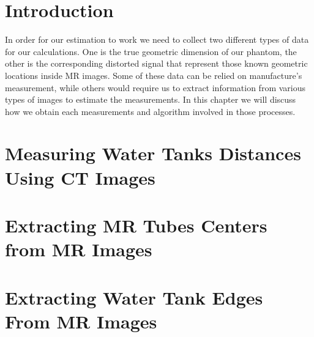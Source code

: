 \section{Introduction}
In order for our estimation to work we need to collect two different types of data for our calculations. 
One is the true geometric dimension of our phantom, the other is the corresponding distorted signal that
represent those known geometric locations inside MR images. Some of these data can be relied on manufacture's
measurement, while others would require us to extract information from various types of images to estimate the
measurements. In this chapter we will discuss how we obtain each measurements and algorithm involved in those
processes.

\section{Measuring Water Tanks Distances Using CT Images}
\label{ct_tank}


\section{Extracting MR Tubes Centers from MR Images}
\label{tubes}


\section{Extracting Water Tank Edges From MR Images}
\label{mri_tank}

